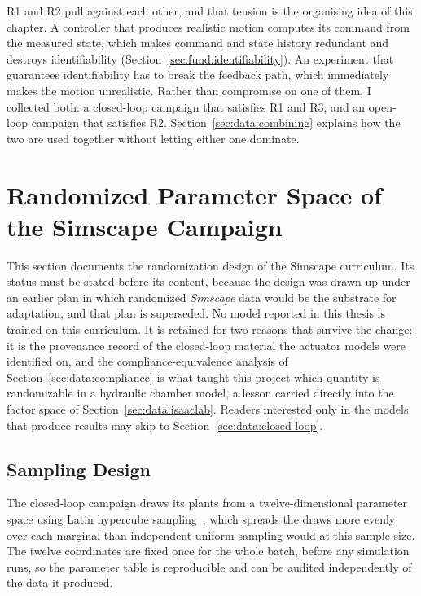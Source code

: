 R1 and R2 pull against each other, and that tension is the organising
idea of this chapter. A controller that produces realistic motion
computes its command from the measured state, which makes command and
state history redundant and destroys identifiability
(Section~\ref{sec:fund:identifiability}). An experiment that guarantees
identifiability has to break the feedback path, which immediately makes
the motion unrealistic. Rather than compromise on one of them, I
collected both: a closed-loop campaign that satisfies R1 and R3, and an
open-loop campaign that satisfies R2. Section~\ref{sec:data:combining}
explains how the two are used together without letting either one
dominate.

\section{Randomized Parameter Space of the Simscape Campaign}
\label{sec:data:randomization}

This section documents the randomization design of the Simscape
curriculum. Its status must be stated before its content, because the
design was drawn up under an earlier plan in which randomized
\emph{Simscape} data would be the substrate for adaptation, and that
plan is superseded. No model reported in this thesis is trained on this
curriculum. It is retained for two reasons that survive the change: it
is the provenance record of the closed-loop material the actuator models
were identified on, and the compliance-equivalence analysis of
Section~\ref{sec:data:compliance} is what taught this project which quantity is randomizable in a hydraulic chamber model, a lesson carried directly into the factor space of
Section~\ref{sec:data:isaaclab}. Readers interested only in the models
that produce results may skip to
Section~\ref{sec:data:closed-loop}.

\subsection{Sampling Design}

The closed-loop campaign draws its plants from a twelve-dimensional
parameter space using Latin hypercube sampling~\cite{mckay1979comparison},
which spreads the draws more evenly over each marginal than independent
uniform sampling would at this sample size. The twelve coordinates are
fixed once for the whole batch, before any simulation runs, so the
parameter table is reproducible and can be audited independently of the
data it produced.

